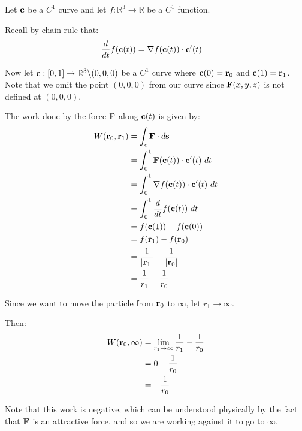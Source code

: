 \begin{solution}
    Let \(\vb{c}\) be a \(C^1\) curve and let \(f: \mathbb{R}^3 \rightarrow \mathbb{R}\) be a \(C^1\) function. 
    
    Recall by chain rule that:
    \begin{align}
        \frac{d}{dt} f(\vb{c}(t)) &= \nabla f(\vb{c}(t)) \cdot \vb{c}'(t)
    \end{align}
    
    \newpage
    
    Now let \(\vb{c}: [0, 1] \rightarrow \mathbb{R}^3 \backslash (0,0,0)\) be a \(C^1\) curve where \(\vb{c}(0) = \vb{r}_0\) and \(\vb{c}(1) = \vb{r}_1\). Note that we omit the point \((0, 0, 0)\) from our curve since \(\vb{F}(x, y, z)\) is not defined at \((0, 0, 0)\).
    
    The work done by the force \(\vb{F}\) along \(\vb{c}(t)\) is given by:
    \begin{align*}
        W(\vb{r}_0, \vb{r}_1) &= \int_c \vb{F} \cdot d \vb{s} \\
        &= \int_0^1 \vb{F}(\vb{c}(t)) \cdot \vb{c}'(t) \ dt \\
        &= \int_0^1 \nabla f(\vb{c}(t)) \cdot \vb{c}'(t) \ dt \\
        &= \int_0^1 \frac{d}{dt} f(\vb{c}(t)) \ dt \\
        &= f(\vb{c}(1)) - f(\vb{c}(0)) \\
        &= f(\vb{r}_1) - f(\vb{r}_0) \\
        &= \frac{1}{|\vb{r}_1|} - \frac{1}{|\vb{r}_0|} \\
        &= \frac{1}{r_1} - \frac{1}{r_0}
    \end{align*}
    
    Since we want to move the particle from \(\vb{r}_0\) to \(\infty\), let \(r_1 \rightarrow \infty\).
    
    Then:
    \begin{align*}
        W(\vb{r}_0, \infty) &= \lim_{r_1 \rightarrow \infty} \frac{1}{r_1} - \frac{1}{r_0} \\
        &= 0 - \frac{1}{r_0} \\
        &= - \frac{1}{r_0} 
    \end{align*}
    
    Note that this work is negative, which can be understood physically by the fact that \(\vb{F}\) is an attractive force, and so we are working against it to go to \(\infty\).
\end{solution}

